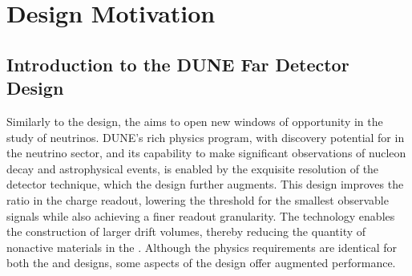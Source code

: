 \chapter{Design Motivation}
\label{ch:fddp-design}

\section{Introduction to the DUNE \dual Far Detector Design}
\label{sec:fddp-design-highlight}


Similarly to the \single design, the  aims to open new windows of opportunity in the study
of neutrinos.  DUNE's rich physics program, with discovery potential for  in the neutrino sector, and its capability to make significant observations of nucleon decay and astrophysical events, is enabled by the exquisite resolution of the \lartpc detector technique, which the \dual design further augments. This design improves the  ratio in the charge readout,  lowering the threshold for the smallest observable signals while also achieving a finer readout granularity.  The \dual technology enables the construction of larger drift volumes, thereby reducing %
the quantity of nonactive materials in the \lar. Although the physics requirements are identical for both the \single and \dual designs, %
 some aspects of the \dual design offer augmented performance. %

